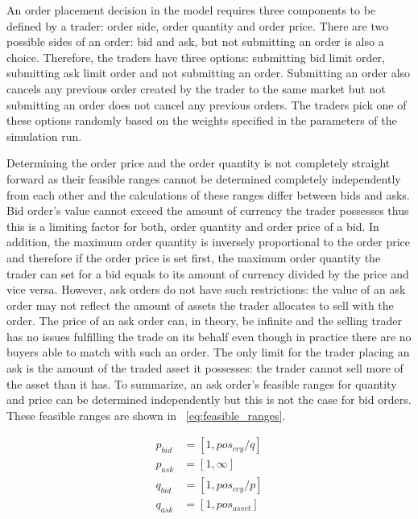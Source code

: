 An order placement decision in the model requires three components 
to be defined by a trader: order side, order quantity and order price. 
There are two possible sides of an order: bid and ask, but
not submitting an order is also a choice. Therefore, the traders
have three options: submitting bid limit order, submitting ask limit order
and not submitting an order. Submitting an order also cancels any previous
order created by the trader to the same market but not submitting an order does not
cancel any previous orders. The traders pick one of these options randomly 
based on the weights specified in the parameters of the simulation run. 

Determining the order price and the order quantity is not completely straight
forward as their feasible ranges cannot be determined completely independently
from each other and the calculations of these ranges differ between bids and asks. Bid order's
value cannot exceed the amount of currency the trader possesses thus this is 
a limiting factor for both, order quantity and order price of a bid. In addition,
the maximum order quantity is inversely proportional to the order price and
therefore if the order price is set first, the maximum order quantity the trader
can set for a bid equals to its amount of currency divided by the price and vice versa. 
However, ask orders do not have such restrictions: the value of an ask order
may not reflect the amount of assets the trader allocates to sell with the order. The
price of an ask order can, in theory, be infinite and the selling trader has no issues
fulfilling the trade on its behalf even though in practice there are no buyers
able to match with such an order. The only limit for the trader placing an ask is the 
amount of the traded asset it possesses: the trader cannot sell more of the asset 
than it has. To summarize, an ask order's feasible ranges for quantity and price 
can be determined independently but this is not the case for bid orders. These feasible 
ranges are shown in ~\ref{eq:feasible_ranges}.

\begin{equation}
\begin{aligned}
p_{bid} &= \left[1, pos_{ccy} / q \right] \\
p_{ask} &= \left[1, \infty \right] \\
q_{bid} &= \left[1, pos_{ccy} / p\right] \\
q_{ask} &= \left[1, pos_{asset}\right] \\
\end{aligned}
\label{eq:feasible_ranges}
\end{equation}

